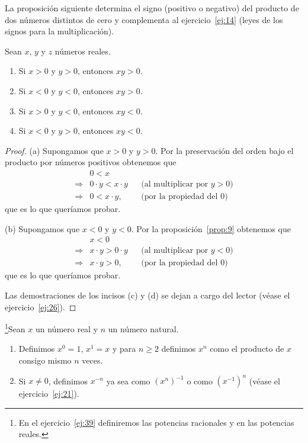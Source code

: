 \documentclass[12pt,a4paper]{book}
\begin{document}
    La proposición siguiente determina el signo (positivo o negativo) del producto
    de dos números distintos de cero y complementa al ejercicio~\ref{ej:14} (leyes
    de los signos para la multiplicación).

    \begin{proposicion}\label{prop:10}
        Sean $x$, $y$ y $z$ números reales.
        \begin{enumerate}[nosep]
            \item Si $x>0$ y $y>0$, entonces $xy>0$.
            \item Si $x<0$ y $y<0$, entonces $xy>0$.
            \item Si $x>0$ y $y<0$, entonces $xy<0$.
            \item Si $x<0$ y $y>0$, entonces $xy<0$.
        \end{enumerate}
    \end{proposicion}

    \begin{proof}
        (a) Supongamos que $x>0$ y $y>0$. Por la preservación del
        orden bajo el producto por números positivos obtenemos que
        \begin{align*}
            &0<x\\
            \Rightarrow{}& 0\cdot y<x\cdot y &&\text{(al multiplicar por $y>0$)}\\
            \Rightarrow{}& 0<x\cdot y, &&\text{(por la propiedad del $0$)}
        \end{align*}
        que es lo que queríamos probar.

        (b) Supongamos que $x<0$ y $y<0$. Por la proposición~\ref{prop:9} obtenemos que
        \begin{align*}
            &x<0\\
            \Rightarrow{}& x\cdot y>0\cdot y &&\text{(al multiplicar por $y<0$)}\\
            \Rightarrow{}& x\cdot y>0, &&\text{(por la propiedad del $0$)}
        \end{align*}
        que es lo que queríamos probar.

        Las demostraciones de los incisos (c) y (d) se dejan a cargo del lector (véase
        el ejercicio~\ref{ej:26}).
    \end{proof}

    \begin{definicion}\label{def:11}
        \footnote{En el ejercicio~\ref{ej:39} definiremos las potencias racionales y en \cite{nunez2020calculoII} las potencias reales.}Sean $x$ un número real y $n$ un número natural.
        \begin{enumerate}[nosep]
            \item Definimos $x^{0}=1$, $x^{1}=x$ y para $n\geq 2$ definimos $x^{n}$ como el producto de
            $x$ consigo mismo $n$ veces.
            \item Si $x\neq 0$, definimos $x^{-n}$ ya sea como $(x^{n})^{-1}$ o como $(x^{-1})^{n}$ (véase el
            ejercicio~\ref{ej:21}).
        \end{enumerate}
    \end{definicion}
\end{document}
